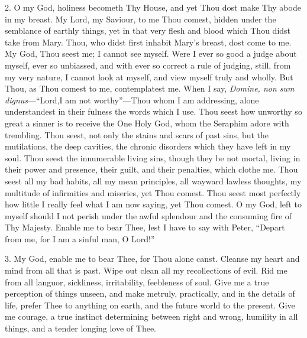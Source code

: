 2. O my God, holiness becometh
Thy House, and yet Thou dost make Thy abode in my breast. My Lord, my
Saviour, to me Thou comest, hidden under the semblance of earthly
things, yet in that very flesh and blood which Thou didst take from
Mary. Thou, who didst first inhabit Mary's breast, dost come to me. My
God, Thou seest me; I cannot see myself. Were I ever so good a judge
about myself, ever so unbiassed, and with ever so correct a rule of
judging, still, from my very nature, I cannot look at myself, and view
myself truly and wholly. But Thou, as Thou comest to me, contemplatest
me. When I say, \emph{Domine, non sum dignus}—``Lord,\emph{}I am not
worthy''—Thou whom I am addressing, alone understandest in their
fulness the words which I use. Thou seest how unworthy so great a sinner
is to receive the One Holy God, whom the Seraphim adore with trembling.
Thou seest, not only the stains and scars of past sins, but the
mutilations, the deep cavities, the chronic disorders which they have
left in my soul. Thou seest the innumerable living sins, though they be
not mortal, living in their power and presence, their guilt, and their
penalties, which clothe me. Thou seest all my bad habits, all my mean
principles, all wayward lawless thoughts, my multitude of infirmities
and miseries, yet Thou comest. Thou seest most perfectly how little I
really feel what I am now saying, yet Thou comest. O my God, left to
myself should I not perish under the awful splendour and the consuming
fire of Thy Majesty. Enable me to bear Thee, lest I have to say with
Peter, ``Depart from me, for I am a sinful man, O Lord!''

3. My God, enable me to bear
Thee, for Thou alone canst. Cleanse my heart and mind from all that is
past. Wipe out clean all my recollections of evil. Rid me from all
languor, sickliness, irritability, feebleness of soul. Give me a true
perception of things unseen, and make me\emph{}truly, practically, and
in the details of life, prefer Thee to anything on earth, and the future
world to the present. Give me courage, a true instinct determining
between right and wrong, humility in all things, and a tender longing
love of Thee.


